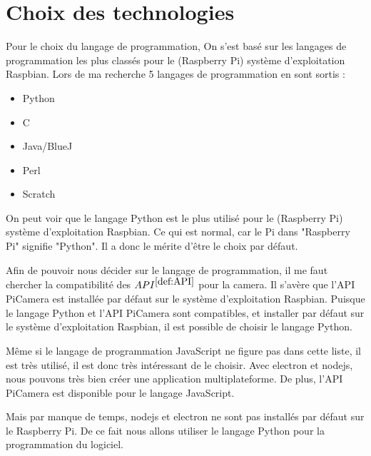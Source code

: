     \section{Choix des technologies}
        Pour le choix du langage de programmation, On s'est basé sur les langages de programmation les plus classés pour le (Raspberry Pi) système d'exploitation Raspbian.
        Lors de ma recherche 5 langages de programmation en sont sortis : 

        \vspace{0.2cm}

        \begin{itemize}
            \item Python
            \item C
            \item Java/BlueJ
            \item Perl
            \item Scratch
        \end{itemize}

        On peut voir que le langage Python est le plus utilisé pour le (Raspberry Pi) système d'exploitation Raspbian. Ce qui est normal, car le Pi dans "Raspberry Pi" signifie "Python". Il a donc le mérite d'être le choix par défaut.

        \vspace{0.2cm}

        Afin de pouvoir nous décider sur le langage de programmation, il me faut chercher la compatibilité des \underline{$API^{\ref{def:API}}$} pour la camera. Il s'avère que l'API PiCamera est installée par défaut sur le système d'exploitation Raspbian. Puisque le langage Python et l'API PiCamera sont compatibles, et installer par défaut sur le système d'exploitation Raspbian, il est possible de choisir le langage Python.

        \vspace{0.2cm}
    
        Même si le langage de programmation JavaScript ne figure pas dans cette liste, il est très utilisé, il est donc très intéressant de le choisir.
        Avec electron et nodejs, nous pouvons très bien créer une application multiplateforme. De plus, l'API PiCamera est disponible pour le langage JavaScript.
    
        Mais par manque de temps, nodejs et electron ne sont pas installés par défaut sur le Raspberry Pi. De ce fait nous allons utiliser le langage Python pour la programmation du logiciel.

